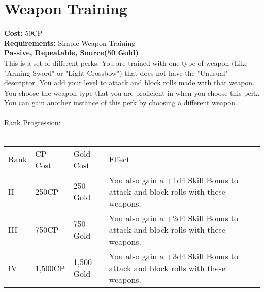 \section{Weapon Training}\label{perk:weaponTraining}
\textbf{Cost:} 50CP\\
\textbf{Requirements:} Simple Weapon Training\\
\textbf{Passive, Repeatable, Source(50 Gold)}\\
This is a set of different perks.
You are trained with one type of weapon (Like "Arming Sword" or "Light Crossbow") that does not have the "Unusual" descriptor.
You add your level to attack and block rolls made with that weapon.\\
You choose the weapon type that you are proficient in when you choose this perk.
You can gain another instance of this perk by choosing a different weapon.\\
\\
Rank Progression:\\
\\
\begin{tabular}{l | l | l | l}
	Rank & CP Cost & Gold Cost & Effect\\
	II & 250CP & 250 Gold & You also gain a +1d4 Skill Bonus to attack and block rolls with these weapons.\\
	III & 750CP & 750 Gold & You also gain a +2d4 Skill Bonus to attack and block rolls with these weapons.\\
	IV & 1,500CP & 1,500 Gold & You also gain a +3d4 Skill Bonus to attack and block rolls with these weapons.\\
\end{tabular}